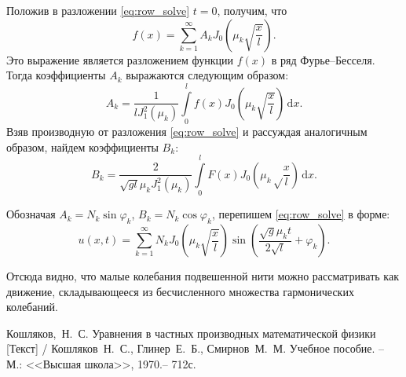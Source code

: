 \documentclass[a4paper, 14pt]{extarticle}
\renewcommand{\phi}{\varphi}
\renewcommand{\d}{\,\mathrm{d}}
\begin{document}
Положив в разложении \eqref{eq:row_solve} \( t = 0 \), получим, что
\[
    f(x) = \sum\limits_{k = 1}^\infty A_k J_0\left(\mu_k \sqrt{\frac{x}{l}} \right).
\]
Это выражение является разложением функции \( f(x) \) в ряд Фурье--Бесселя. Тогда
коэффициенты \( A_k \) выражаются следующим образом:
\[
    A_k = \frac{1}{l J_1^2(\mu_k)} \int\limits_0^l f(x)J_0\left(\mu_k\sqrt{\frac{x}{l}}\right)\d x.
\]
Взяв производную от разложения \eqref{eq:row_solve} и рассуждая аналогичным
образом, найдем коэффициенты \( B_k \):
\[
    B_k = \frac{2}{\sqrt{gl}\mu_k J_1^2(\mu_k)} \int\limits_0^l F(x)J_0
    \left(\mu_k\sqrt\frac{x}{l}\right)\d x.
\]

Обозначая \( A_k = N_k\sin\phi_k \), \( B_k = N_k\cos\phi_k \), перепишем
\eqref{eq:row_solve} в форме:
\begin{equation}
    u(x, t) = \sum\limits_{k = 1}^\infty N_k J_0\left(\mu_k\sqrt{\frac{x}{l}}\right)
    \sin\left(\frac{\sqrt{g}\mu_kt}{2\sqrt{l}} + \phi_k\right).
    \label{eq:final_solve}
\end{equation}

Отсюда видно, что малые колебания подвешенной нити можно рассматривать
как движение, складывающееся из бесчисленного множества гармонических
колебаний.

\newpage
{}
\begin{thebibliography}{9}
    Кошляков,~Н.~С. Уравнения в частных производных
    математической физики [Текст] / Кошляков~Н.~С., Глинер~Е.~Б., Смирнов~М.~М.
    Учебное пособие. -- М.: <<Высшая школа>>, 1970.-- 712с.
\end{thebibliography}
\end{document}
